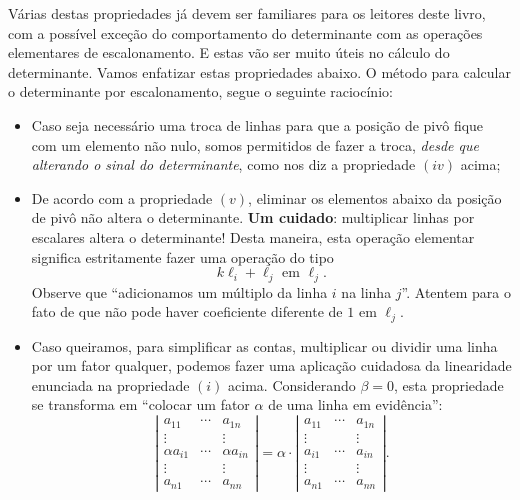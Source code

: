 Várias destas propriedades já devem ser familiares para os leitores deste livro, com a possível exceção do comportamento do determinante com as operações elementares de escalonamento. E estas vão ser muito úteis no cálculo do determinante. Vamos enfatizar estas propriedades abaixo. O método para calcular o determinante por escalonamento, segue o seguinte raciocínio:
\begin{itemize}
\item Caso seja necessário uma troca de linhas para que a posição de pivô fique com um elemento não nulo, somos permitidos de fazer a troca, \textit{desde que alterando o sinal do determinante}, como nos diz a propriedade $(iv)$ acima;
\item De acordo com a propriedade $(v)$, eliminar os elementos abaixo da posição de pivô não altera o determinante. \textbf{Um cuidado}: multiplicar linhas por escalares altera o determinante! Desta maneira, esta operação elementar significa estritamente fazer uma operação do tipo
\begin{equation}
k \ell_i + \ell_j \text{ em } \ell_j.
\end{equation} Observe que ``adicionamos um múltiplo da linha $i$ na linha $j$''. Atentem para o fato de que não pode haver coeficiente diferente de $1$ em $\ell_j$.
\item Caso queiramos, para simplificar as contas, multiplicar ou dividir uma linha por um fator qualquer, podemos fazer uma aplicação cuidadosa da linearidade enunciada na propriedade $(i)$ acima. Considerando $\beta = 0$, esta propriedade se transforma em ``colocar um fator $\alpha$ de uma linha em evidência'':
\begin{equation}
\left| \begin{matrix}
a_{11} & \cdots & a_{1n} \\
\vdots &  & \vdots \\
\alpha a_{i1} & \cdots & \alpha a_{in} \\
\vdots &  & \vdots \\
a_{n1} & \cdots & a_{nn}
\end{matrix} \right|  =
\alpha \cdot \left| \begin{matrix}
a_{11} & \cdots & a_{1n} \\
\vdots &  & \vdots \\
a_{i1} & \cdots & a_{in} \\
\vdots &  & \vdots \\
a_{n1} & \cdots & a_{nn}
\end{matrix}\right| .
\end{equation}
\end{itemize}

